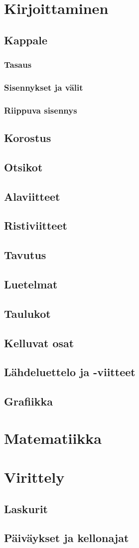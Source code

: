 \documentclass[a4paper,10pt,notitlepage,oneside]{book}
\begin{document}
\chapter{Kirjoittaminen}
\section{Kappale}
\subsection{Tasaus}
\subsection{Sisennykset ja välit}
\subsection{Riippuva sisennys}
\section{Korostus}
\section{Otsikot}
\section{Alaviitteet}
\section{Ristiviitteet}
\section{Tavutus}
\section{Luetelmat}
\section{Taulukot}
\section{Kelluvat osat}
\section{Lähdeluettelo ja -viitteet}
\section{Grafiikka}

\chapter{Matematiikka}

\chapter{Virittely}
\section{Laskurit}
\section{Päiväykset ja kellonajat}
\end{document}
